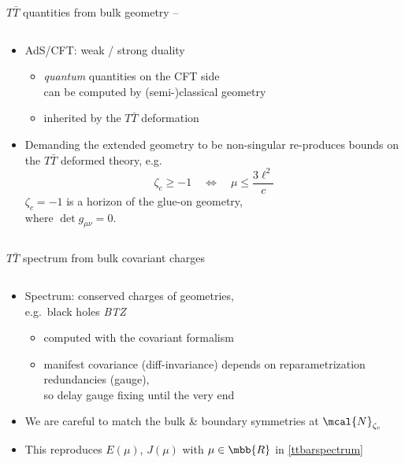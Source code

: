 \documentclass[
	10pt
	,noamsthm
]{beamer}
\newcommand{\TTbar}{\texorpdfstring{\ensuremath{T\bar{T}}}{TTbar}\xspace}
\begin{document}
\begin{frame}{\TTbar quantities from bulk geometry}{%
	\textcite{Apolo:2023vnm} -- 
}
\begin{columns}
\figGlueon[.3]
\begin{column}{.75\textwidth}
\begin{itemize}
\item AdS/CFT: weak / strong duality
	\begin{itemize}
	\item \textit{quantum} quantities on the CFT side\\
		can be computed by (semi-)classical geometry
	\item inherited by the \TTbar deformation
	\end{itemize}
	
\pause
\item Demanding the extended geometry to be non-singular
	re-produces bounds on the \TTbar deformed theory, e.g.
	\begin{equation}
		\zeta_c \ge -1 \quad \Leftrightarrow \quad\mu\le \frac{ 3\ell^2 }{c} \label{reality}
	\end{equation}
	$\zeta_c = -1$ is a horizon of the glue-on geometry, \\
	where $\det g_{\mu\nu} = 0$.
	
\end{itemize}
\end{column}
\end{columns}
\end{frame}


\begin{frame}{\TTbar spectrum from bulk covariant charges}{%
	\textcite{Kraus:2021cwf,Apolo:2023vnm}
}
\begin{columns}
\figGlueon[.3]
\begin{column}{.75\textwidth}
\vspace{-.3\baselineskip}
\begin{itemize}
\item Spectrum: conserved charges of geometries,\\
	e.g.~black holes \textit{BTZ} \cite{Banados:1992wn}
	\begin{itemize}
	\item computed with the covariant formalism\\
		\textcite{Iyer:1994ys, Barnich:2001jy}
	\item manifest covariance (diff-invariance) depends on reparametrization redundancies (gauge),\\
		so delay gauge fixing until the very end
	\end{itemize}
	
\pause
\item We are careful to match the bulk \& boundary symmetries at $\mcal{N}_{\zeta_c}$

\item This reproduces $E(\mu)$, $J(\mu)$ with $\mu \in\mbb{R}$ in \eqref{ttbarspectrum}
	
\end{itemize}
\end{column}
\end{columns}
\end{frame}
\end{document}
